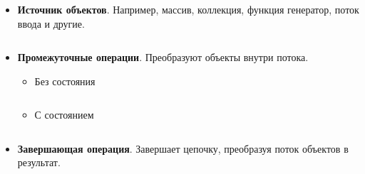 \begin{frame}
\frametitle{\insertsection} 
\framesubtitle{\insertsubsection}
\begin{itemize}
	\item \textbf{Источник объектов}. Например, массив, коллекция, функция генератор, поток ввода и другие.
	\inputminted{java}{code/Producer.java}
	\item \textbf{Промежуточные операции}. Преобразуют объекты внутри потока.
	\begin{itemize}
		\item Без состояния
		\inputminted{java}{code/Stateless.java}
		\item С состоянием
		\inputminted{java}{code/Stateful.java}
	\end{itemize}
	\item \textbf{Завершающая операция}. Завершает цепочку, преобразуя поток объектов в результат.
	\inputminted{java}{code/Termination.java}
\end{itemize}
\end{frame}
